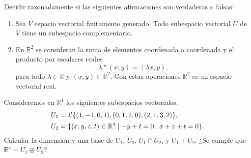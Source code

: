\documentclass[12pt]{article}
\begin{document}
    \begin{ejercicio}[2 puntos]
        Decidir razonadamente si las siguientes afirmaciones son verdaderas o falsas:
        \begin{enumerate}
            \item Sea $V$ espacio vectorial finitamente generado. Todo subespacio vectorial $U$ de $V$ tiene un subespacio complementario.
            \item En $\mathbb{R}^2$ se consideran la suma de elementos coordenada a coordenada y el producto por escalares reales
            \[
            \lambda * (x, y) = (\lambda x, y),
            \]
            para todo $\lambda \in \mathbb{R}$ y $(x, y) \in \mathbb{R}^2$. Con estas operaciones $\mathbb{R}^2$ es un espacio vectorial real.
        \end{enumerate}
    \end{ejercicio}
        
    \begin{ejercicio}[3 puntos]
        Consideremos en $\mathbb{R}^4$ los siguientes subespacios vectoriales:
        \begin{align*}
        U_1 &= \mathcal{L}\{(1, -1, 0, 1), (0, 1, 1, 0), (2, 1, 3, 2)\}, \\
        U_2 &= \{(x, y, z, t) \in \mathbb{R}^4 \mid -y + t = 0,~ x + z + t = 0\}.
        \end{align*}
        Calcular la dimensión y una base de $U_1$, $U_2$, $U_1 \cap U_2$, y $U_1 + U_2$. ¿Se cumple que $\mathbb{R}^4 = U_1 \oplus U_2$?
    \end{ejercicio}
        
\end{document}
